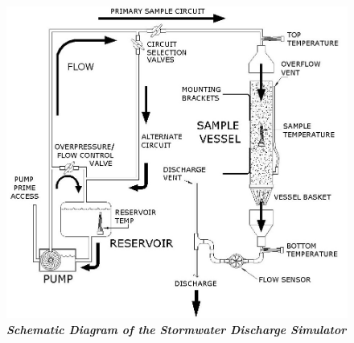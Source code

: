 \begin{center}
\begin{figure}
\noindent
\includegraphics[scale=0.5]{DISCHARGER.jpg}
\caption[Stormwater Discharge Simulator Schematic]{\textbf{\emph{Schematic Diagram of the Stormwater Discharge Simulator}}\label{discharger}}
\end{figure}


\end{center}
